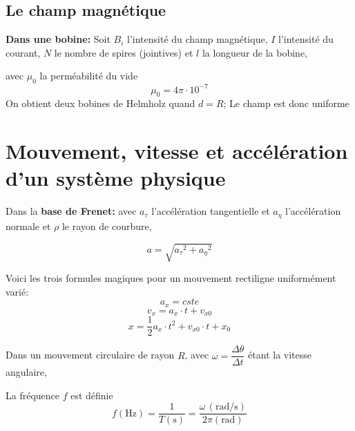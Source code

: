 \documentclass[main.tex]{subfiles}
\begin{document}
\subsection{Le champ magnétique}

\begin{Definition}
    \textbf{Dans une bobine:} Soit $B_{i}$ l'intensité du champ magnétique, $I$ l'intensité du courant, $N$ le nombre de spires (jointives) et $l$ la longueur de la bobine,


    avec $\mu_{0}$ la perméabilité du vide
    $$\mu_{0}=4\pi\cdot10^{-7} $$
    On obtient deux bobines de Helmholz quand $d=R$; Le champ est donc uniforme
\end{Definition}

\section{Mouvement, vitesse et accélération d'un système physique}

\begin{Definition}
    Dans la \textbf{base de Frenet:} avec $a_{\tau}$ l'accélération tangentielle et $a_{\eta}$ l'accélération normale et $\rho$ le rayon de courbure,


    $$a=\sqrt{{a_{\tau}}^2 + {a_{\eta}}^2}$$

    Voici les trois formules magiques pour un mouvement rectiligne uniformément varié:
    $$a_{x}=cste $$
    $$v_{x}=a_{x}\cdot t +v_{x0}$$
    $$x=\frac{1}{2}a_{x}\cdot t^2 + v_{x0}\cdot t +x_{0} $$

    Dans un mouvement circulaire de rayon $R$, avec $\omega = \dfrac{\Delta \theta}{\Delta t}$ étant la vitesse angulaire,



    La fréquence $f$ est définie
    $$f(\text{Hz}) = \dfrac{1}{T(\text{s})} = \dfrac{\omega\, (\text{rad/s})}{2\pi(\text{rad})}$$
\end{Definition}
\end{document}
